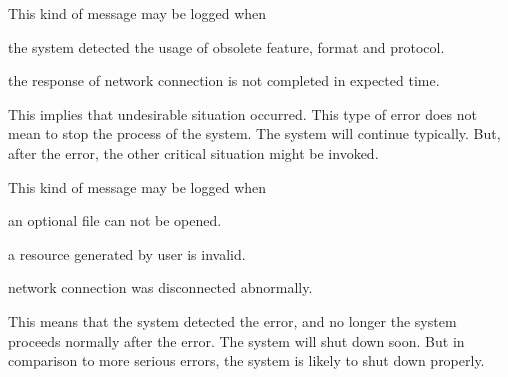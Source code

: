 \begin{Desc}
\begin{description}
This kind of message may be logged when
\begin{DoxyItemize}
\item the system detected the usage of obsolete feature, format and protocol.
\item the response of network connection is not completed in expected time. 
\end{DoxyItemize}\item[{\em 
\hypertarget{structhryky_1_1log_1_1level_1_1_kind_aa121006343f8971f566b5490b8001b21ae0769f08396c2cb3bf27ab8e8226f728}{err\-\_\-}\label{structhryky_1_1log_1_1level_1_1_kind_aa121006343f8971f566b5490b8001b21ae0769f08396c2cb3bf27ab8e8226f728}
}]This implies that undesirable situation occurred. This type of error does not mean to stop the process of the system. The system will continue typically. But, after the error, the other critical situation might be invoked.

This kind of message may be logged when
\begin{DoxyItemize}
\item an optional file can not be opened.
\item a resource generated by user is invalid.
\item network connection was disconnected abnormally. 
\end{DoxyItemize}\item[{\em 
\hypertarget{structhryky_1_1log_1_1level_1_1_kind_aa121006343f8971f566b5490b8001b21a0c2b12dd607bc861ea48a54ffaecb235}{crit\-\_\-}\label{structhryky_1_1log_1_1level_1_1_kind_aa121006343f8971f566b5490b8001b21a0c2b12dd607bc861ea48a54ffaecb235}
}]This means that the system detected the error, and no longer the system proceeds normally after the error. The system will shut down soon. But in comparison to more serious errors, the system is likely to shut down properly.


\end{description}
\end{Desc}
